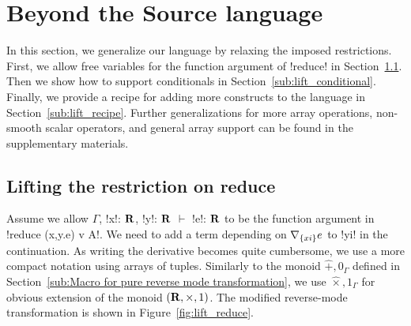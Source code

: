 \section{Beyond the Source language}
\label{sec:generalization}
In this section, we generalize our language by relaxing the imposed restrictions.
First, we allow free variables for the function argument of !reduce! in Section~\ref{sub:lift_reduce}. 
Then we show how to support conditionals in Section~\ref{sub:lift_conditional}.
Finally, we provide a recipe for adding more constructs to the language in Section~\ref{sub:lift_recipe}. Further generalizations for more array operations, non-smooth scalar operators, and general array support can be found in the supplementary materials.

\subsection{Lifting the restriction on reduce}
\label{sub:lift_reduce}

Assume we allow $\Gamma$, !x!: $\mathbf{R}$, !y!: $\mathbf{R}$ $\vdash$ !e!: $\mathbf{R}$ to be the function argument in
!reduce (x,y.e) v A!. We need to add a term depending on $\nabla_{\{xi\}}e$ to !yi! in the continuation.
As writing the derivative becomes quite cumbersome, we use a more compact notation using arrays of tuples. 
Similarly to the monoid $\widehat{+},0_\Gamma$ defined in Section~\ref{sub:Macro for pure reverse mode transformation},
we use $\widehat{\times},1_\Gamma$ for obvious extension of the monoid $(\mathbf{R},\times,1)$. 
The modified reverse-mode transformation is shown in Figure~\ref{fig:lift_reduce}.

